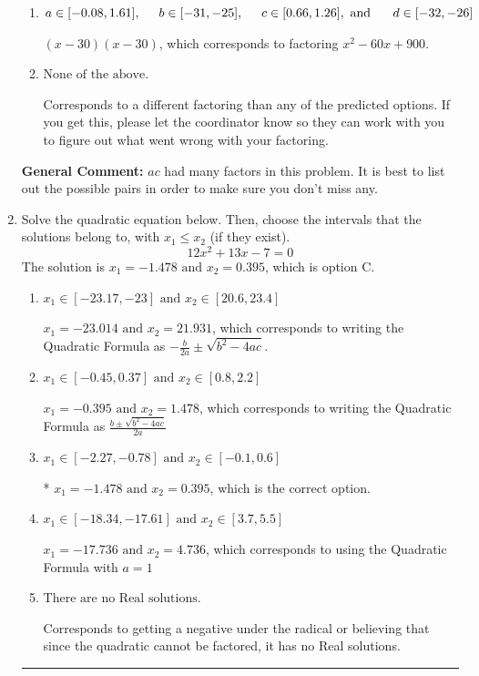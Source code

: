 \documentclass{extbook}[14pt]
\newcommand{\litem}[1]{\item #1

\rule{\textwidth}{0.4pt}}
\begin{document}
\begin{enumerate}
{\begin{enumerate}[label=\Alph*.]
* $(6x -5)(6x -5)$, which is the correct option.
\item \( a \in [-0.08, 1.61], \hspace*{5mm} b \in [-31, -25], \hspace*{5mm} c \in [0.66, 1.26], \text{ and } \hspace*{5mm} d \in [-32, -26] \)

 $(x -30)(x -30)$, which corresponds to factoring $x^{2} -60 x + 900$.
\item \( \text{None of the above.} \)

 Corresponds to a different factoring than any of the predicted options. If you get this, please let the coordinator know so they can work with you to figure out what went wrong with your factoring.
\end{enumerate}

\textbf{General Comment:} $ac$ had many factors in this problem. It is best to list out the possible pairs in order to make sure you don't miss any.
}
\litem{
Solve the quadratic equation below. Then, choose the intervals that the solutions belong to, with $x_1 \leq x_2$ (if they exist).
\[ 12x^{2} +13 x -7 = 0 \]
The solution is \( x_1 = -1.478 \text{ and } x_2 = 0.395 \), which is option C.\begin{enumerate}[label=\Alph*.]
\item \( x_1 \in [-23.17, -23] \text{ and } x_2 \in [20.6, 23.4] \)

 $x_1 = -23.014 \text{ and } x_2 = 21.931$, which corresponds to writing the Quadratic Formula as $-\frac{b}{2a} \pm \sqrt{b^2 - 4ac}$.
\item \( x_1 \in [-0.45, 0.37] \text{ and } x_2 \in [0.8, 2.2] \)

 $x_1 = -0.395 \text{ and } x_2 = 1.478$, which corresponds to writing the Quadratic Formula as $\frac{b \pm \sqrt{b^2 - 4ac}}{2a}$
\item \( x_1 \in [-2.27, -0.78] \text{ and } x_2 \in [-0.1, 0.6] \)

* $x_1 = -1.478 \text{ and } x_2 = 0.395$, which is the correct option.
\item \( x_1 \in [-18.34, -17.61] \text{ and } x_2 \in [3.7, 5.5] \)

 $x_1 = -17.736 \text{ and } x_2 = 4.736$, which corresponds to using the Quadratic Formula with $a=1$
\item \( \text{There are no Real solutions.} \)

Corresponds to getting a negative under the radical or believing that since the quadratic cannot be factored, it has no Real solutions.
\end{enumerate}

}
\end{enumerate}
\end{document}
